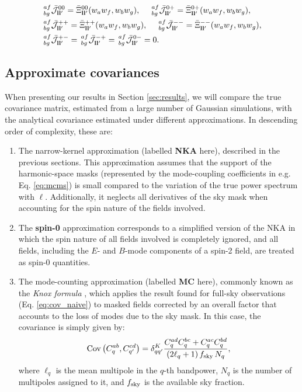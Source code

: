 \documentclass[a4paper,11pt]{article}
\begin{document}
        \begin{align}\label{eq:coeff_cmcm_flat}
          &\,^{af}_{bg}\bar{\mathcal{J}}^{00}_{{\bf l}{\bf l}'}=\bar{\Xi}^{00}_{{\bf l}{\bf l}'}(w_aw_f,w_bw_g),\hspace{12pt}
           \,^{af}_{bg}\bar{\mathcal{J}}^{0+}_{{\bf l}{\bf l}'}=\bar{\Xi}^{0+}_{{\bf l}{\bf l}'}(w_aw_f,w_bw_g),\\
          &\,^{af}_{bg}\bar{\mathcal{J}}^{++}_{{\bf l}{\bf l}'}=\bar{\Xi}^{++}_{{\bf l}{\bf l}'}(w_aw_f,w_bw_g),\hspace{12pt}
           \,^{af}_{bg}\bar{\mathcal{J}}^{--}_{{\bf l}{\bf l}'}=\bar{\Xi}^{--}_{{\bf l}{\bf l}'}(w_aw_f,w_bw_g),\\
          &\,^{af}_{bg}\bar{\mathcal{J}}^{+-}_{{\bf l}{\bf l}'}=
           \,^{af}_{bg}\bar{\mathcal{J}}^{-+}_{{\bf l}{\bf l}'}=
           \,^{af}_{bg}\bar{\mathcal{J}}^{0-}_{{\bf l}{\bf l}'}=0.
        \end{align}
        
    \subsection{Approximate covariances}\label{ssec:theory.approx}
      When presenting our results in Section \ref{sec:results}, we will compare the true covariance matrix, estimated from a large number of Gaussian simulations, with the analytical covariance estimated under different approximations. In descending order of complexity, these are:
      \begin{enumerate}
        \item The narrow-kernel approximation (labelled {\bf NKA} here), described in the previous sections. This approximation assumes that the support of the harmonic-space masks (represented by the mode-coupling coefficients in e.g. Eq. \ref{eq:mcms}) is small compared to the variation of the true power spectrum with $\ell$. Additionally, it neglects all derivatives of the sky mask when accounting for the spin nature of the fields involved.
        \item The {\bf spin-0} approximation corresponds to a simplified version of the NKA in which the spin nature of all fields involved is completely ignored, and all fields, including the $E$- and $B$-mode components of a spin-2 field, are treated as spin-0 quantities.
        \item The mode-counting approximation (labelled {\bf MC} here), commonly known as the {\sl Knox formula} \cite{1995PhRvD..52.4307K}, which applies the result found for full-sky observations (Eq. \ref{eq:cov_naive}) to masked fields corrected by an overall factor that accounts to the loss of modes due to the sky mask. In this case, the covariance is simply given by:
        \begin{equation}\label{eq:cov_naive_bpw}
          {\rm Cov}\left(C^{ab}_q,C^{cd}_{q'}\right)=\delta^K_{qq'}\frac{C^{ad}_qC^{bc}_q+C^{ac}_qC^{bd}_q}{(2\ell_q+1)\,f_{\rm sky}\,N_q},
        \end{equation}
        where $\ell_q$ is the mean multipole in the $q$-th bandpower, $N_q$ is the number of multipoles assigned to it, and $f_{\rm sky}$ is the available sky fraction.
      \end{enumerate}
\end{document}
